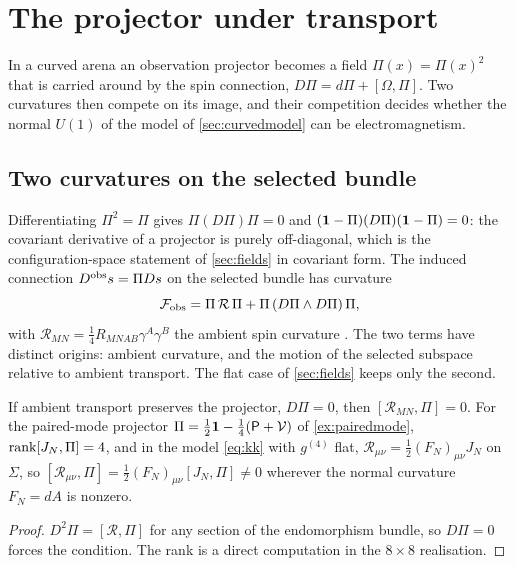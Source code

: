 \section{The projector under transport}
\label{sec:transport}

In a curved arena an observation projector becomes a field $\Pi(x)=\Pi(x)^2$ that is carried around by the spin connection, $D\Pi=d\Pi+[\Omega,\Pi]$. Two
curvatures then compete on its image, and their competition decides whether the normal $U(1)$ of the model of \cref{sec:curvedmodel} can be electromagnetism.

\subsection{Two curvatures on the selected bundle}

Differentiating $\Pi^2=\Pi$ gives $\Pi(D\Pi)\Pi=0$ and $(\mathbf 1-\Pi)(D\Pi)(\mathbf 1-\Pi)=0$: the covariant derivative of a projector is purely off-diagonal, which is the
configuration-space statement of \cref{sec:fields} in covariant form. The induced connection $D^{\rm obs}s=\Pi Ds$ on the selected bundle has curvature
\begin{equation}
\label{eq:Fobs}
\mathcal F_{\rm obs}=\Pi\,\mathcal R\,\Pi+\Pi\,(D\Pi\wedge D\Pi)\,\Pi ,
\end{equation}
with $\mathcal R_{MN}=\tfrac14R_{MNAB}\gamma^A\gamma^B$ the ambient spin curvature \cite{LawsonMichelsohn}. The two terms have distinct origins: ambient curvature, and the
motion of the selected subspace relative to ambient transport. The flat case of \cref{sec:fields} keeps only the second.

\begin{proposition}
\label{prop:obstruct}
If ambient transport preserves the projector, $D\Pi=0$, then $[\mathcal R_{MN},\Pi]=0$. For the paired-mode projector $\Pi=\tfrac12\mathbf 1-\tfrac14(\mathsf P+\mathcal V)$ of
\cref{ex:pairedmode}, $\operatorname{rank}[J_N,\Pi]=4$, and in the model \eqref{eq:kk} with $g^{(4)}$ flat, $\mathcal R_{\mu\nu}=\tfrac12(F_N)_{\mu\nu}J_N$ on $\Sigma$, so
$[\mathcal R_{\mu\nu},\Pi]=\tfrac12(F_N)_{\mu\nu}[J_N,\Pi]\neq0$ wherever the normal curvature $F_N=dA$ is nonzero.
\end{proposition}

\begin{proof}
$D^2\Pi=[\mathcal R,\Pi]$ for any section of the endomorphism bundle, so $D\Pi=0$ forces the condition. The rank is a direct computation in the $8\times8$ realisation.
\end{proof}

